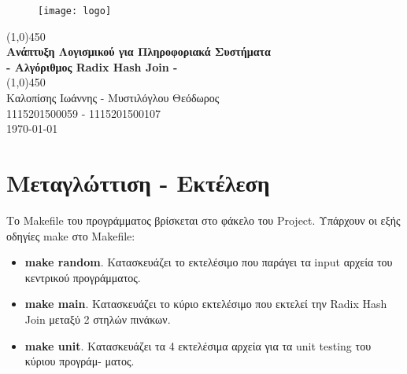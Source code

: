 \documentclass[12pt, a4paper]{article}
\begin{document}
\begin{titlepage}
\begin{center}
\vspace*{1cm}
\begin{figure}
\centering
\texttt{[image: logo]}\\
\end{figure}
\vfill
\line(1,0){450}\\[1mm]
\huge{\textbf{Ανάπτυξη Λογισμικού για Πληροφοριακά Συστήματα}}\\[3mm]
\Large{\textbf{- Αλγόριθμος Radix Hash Join -}}\\[1mm]
\line(1,0){450}\\
\vfill
Καλοπίσης Ιωάννης - Μυστιλόγλου Θεόδωρος\\
1115201500059 - 1115201500107\\
\today\\

\end{center}
\end{titlepage}

\tableofcontents
\thispagestyle{empty}
\clearpage

\setcounter{page}{1}

\section{Μεταγλώττιση - Eκτέλεση}
Το Makefile του προγράμματος βρίσκεται στο φάκελο του Project. Υπάρχουν οι εξής οδηγίες make στο Makefile:
\begin{itemize}
	\item \textbf{make random}. Κατασκευάζει το εκτελέσιμο που παράγει τα input αρχεία του κεντρικού προγράμματος.
	\item \textbf{make main}. Κατασκευάζει το κύριο εκτελέσιμο που εκτελεί την Radix Hash Join μεταξύ 2 στηλών πινάκων.
	\item \textbf{make unit}. Κατασκευάζει τα 4 εκτελέσιμα αρχεία για τα unit testing του κύριου προγράμ- ματος.
\end{itemize}
\end{document}
